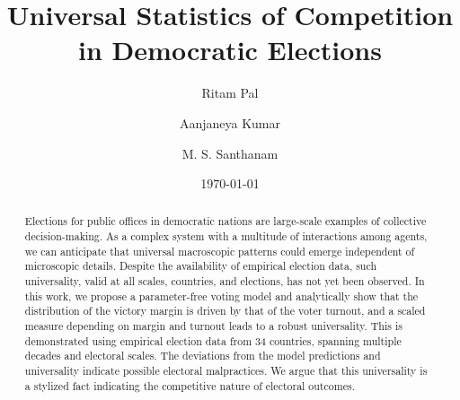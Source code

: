 \documentclass[reprint,aps,prl,showpacs,twocolumn, superscriptaddress]{revtex4-2}
\begin{document}
\title{Universal Statistics of Competition in Democratic Elections}

\author{Ritam Pal}
\author{Aanjaneya Kumar}
\author{M. S. Santhanam}

\date{\today}

\begin{abstract}
Elections for public offices in democratic nations are large-scale examples of collective decision-making. As a complex system with a multitude of interactions among agents, we can anticipate that universal macroscopic patterns could emerge independent of microscopic details. Despite the availability of empirical election data, such universality, valid at all scales, countries, and elections, has not yet been observed. In this work, we propose a parameter-free voting model and analytically show that the distribution of the victory margin is driven by that of the voter turnout, and a scaled measure depending on margin and turnout leads to a robust universality. This is demonstrated using empirical election data from $34$ countries, spanning multiple decades and electoral scales. The deviations from the model predictions and universality indicate possible electoral malpractices. We argue that this universality is a stylized fact indicating the competitive nature of electoral outcomes.
\end{abstract}

\maketitle
\end{document}
